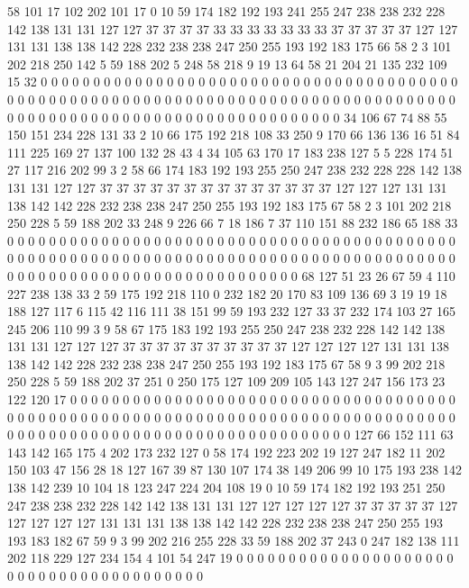 58 101 17 102 202 101 17 0 10 59 174 182 192 193 241 255 247 238 238 232
228 142 138 131 131 127 127 37 37 37 37 33 33 33 33 33 33 33 37 37
37 37 37 127 127 131 131 138 138 142 228 232 238 238 247 250 255 193 192 183
175 66 58 2 3 101 202 218 250 142 5 59 188 202 5 248 58 218 9 19
13 64 58 21 204 21 135 232 109 15 32 0 0 0 0 0 0 0 0 0
0 0 0 0 0 0 0 0 0 0 0 0 0 0 0 0 0 0 0 0
0 0 0 0 0 0 0 0 0 0 0 0 0 0 0 0 0 0 0 0
0 0 0 0 0 0 0 0 0 0 0 0 0 0 0 0 0 0 0 0
0 0 0 0 0 0 0 0 0 0 0 0 0 0 0 0 0 0 0 0
0 0 0 0 0 0 0 0 0 0 0 0 0 0 0 0 0 0 0 0
0 0 0 0 0 0 34 106 67 74 88 55 150 151 234 228 131 33 2 10
66 175 192 218 108 33 250 9 170 66 136 136 16 51 84 111 225 169 27 137
100 132 28 43 4 34 105 63 170 17 183 238 127 5 5 228 174 51 27 117
216 202 99 3 2 58 66 174 183 192 193 255 250 247 238 232 228 228 142 138
131 131 127 127 37 37 37 37 37 37 37 37 37 37 37 37 37 37 127 127
127 131 131 138 142 142 228 232 238 238 247 250 255 193 192 183 175 67 58 2
3 101 202 218 250 228 5 59 188 202 33 248 9 226 66 7 18 186 7 37
110 151 88 232 186 65 188 33 0 0 0 0 0 0 0 0 0 0 0 0
0 0 0 0 0 0 0 0 0 0 0 0 0 0 0 0 0 0 0 0
0 0 0 0 0 0 0 0 0 0 0 0 0 0 0 0 0 0 0 0
0 0 0 0 0 0 0 0 0 0 0 0 0 0 0 0 0 0 0 0
0 0 0 0 0 0 0 0 0 0 0 0 0 0 0 0 0 0 0 0
0 0 0 0 0 0 0 0 0 0 0 0 0 0 0 0 0 0 0 0
0 0 68 127 51 23 26 67 59 4 110 227 238 138 33 2 59 175 192 218
110 0 232 182 20 170 83 109 136 69 3 19 19 18 188 127 117 6 115 42
116 111 38 151 99 59 193 232 127 33 37 232 174 103 27 165 245 206 110 99
3 9 58 67 175 183 192 193 255 250 247 238 232 228 142 142 138 131 131 127
127 127 37 37 37 37 37 37 37 37 37 37 127 127 127 127 131 131 138 138
142 142 228 232 238 238 247 250 255 193 192 183 175 67 58 9 3 99 202 218
250 228 5 59 188 202 37 251 0 250 175 127 109 209 105 143 127 247 156 173
23 122 120 17 0 0 0 0 0 0 0 0 0 0 0 0 0 0 0 0
0 0 0 0 0 0 0 0 0 0 0 0 0 0 0 0 0 0 0 0
0 0 0 0 0 0 0 0 0 0 0 0 0 0 0 0 0 0 0 0
0 0 0 0 0 0 0 0 0 0 0 0 0 0 0 0 0 0 0 0
0 0 0 0 0 0 0 0 0 0 0 0 0 0 0 0 0 0 0 0
0 0 0 0 0 0 0 0 0 0 0 0 0 0 0 0 0 127 66 152
111 63 143 142 165 175 4 202 173 232 127 0 58 174 192 223 202 19 127 247
182 11 202 150 103 47 156 28 18 127 167 39 87 130 107 174 38 149 206 99
10 175 193 238 142 138 142 239 10 104 18 123 247 224 204 108 19 0 10 59
174 182 192 193 251 250 247 238 238 232 228 142 142 138 131 131 127 127 127 127
127 37 37 37 37 37 127 127 127 127 127 131 131 131 138 138 142 142 228 232
238 238 247 250 255 193 193 183 182 67 59 9 3 99 202 216 255 228 33 59
188 202 37 243 0 247 182 138 111 202 118 229 127 234 154 4 101 54 247 19
0 0 0 0 0 0 0 0 0 0 0 0 0 0 0 0 0 0 0 0
0 0 0 0 0 0 0 0 0 0 0 0 0 0 0 0 0 0 0 0
